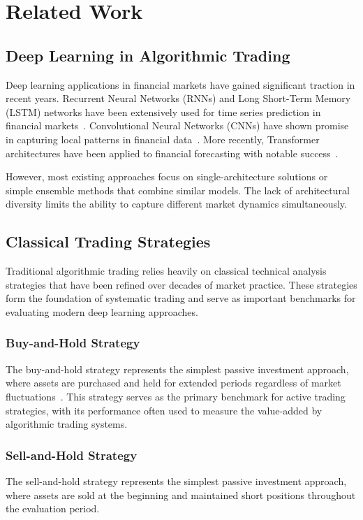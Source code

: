 \documentclass[10pt,twocolumn]{article}
\begin{document}
\section{Related Work}

\subsection{Deep Learning in Algorithmic Trading}

Deep learning applications in financial markets have gained significant traction in recent years. Recurrent Neural Networks (RNNs) and Long Short-Term Memory (LSTM) networks have been extensively used for time series prediction in financial markets~\cite{financial_lstm}. Convolutional Neural Networks (CNNs) have shown promise in capturing local patterns in financial data~\cite{financial_cnn}. More recently, Transformer architectures have been applied to financial forecasting with notable success~\cite{financial_transformer}.

However, most existing approaches focus on single-architecture solutions or simple ensemble methods that combine similar models. The lack of architectural diversity limits the ability to capture different market dynamics simultaneously.

\subsection{Classical Trading Strategies}

Traditional algorithmic trading relies heavily on classical technical analysis strategies that have been refined over decades of market practice. These strategies form the foundation of systematic trading and serve as important benchmarks for evaluating modern deep learning approaches.

\subsubsection{Buy-and-Hold Strategy}
The buy-and-hold strategy represents the simplest passive investment approach, where assets are purchased and held for extended periods regardless of market fluctuations~\cite{buy_hold_strategy}. This strategy serves as the primary benchmark for active trading strategies, with its performance often used to measure the value-added by algorithmic trading systems.

\subsubsection{Sell-and-Hold Strategy}
The sell-and-hold strategy represents the simplest passive investment approach, where assets are sold at the beginning and maintained short positions throughout the evaluation period.
\end{document}
